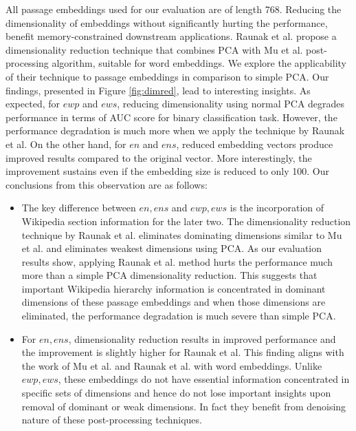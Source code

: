 \documentclass[sigconf,authordraft]{acmart}
\begin{document}
All passage embeddings used for our evaluation are of length 768. Reducing the dimensionality of embeddings without significantly hurting the performance, benefit memory-constrained downstream applications. Raunak et al. propose a dimensionality reduction technique that combines PCA with Mu et al. post-processing algorithm, suitable for word embeddings. We explore the applicability of their technique to passage embeddings in comparison to simple PCA. Our findings, presented in Figure \ref{fig:dimred}, lead to interesting insights. As expected, for $ewp$ and $ews$, reducing dimensionality using normal PCA degrades performance in terms of AUC score for binary classification task. However, the performance degradation is much more when we apply the technique by Raunak et al. On the other hand, for $en$ and $ens$, reduced embedding vectors produce improved results compared to the original vector. More interestingly, the improvement sustains even if the embedding size is reduced to only 100. Our conclusions from this observation are as follows:
\begin{itemize}
    \item The key difference between $en, ens$ and $ewp, ews$ is the incorporation of Wikipedia section information for the later two. The dimensionality reduction technique by Raunak et al. eliminates dominating dimensions similar to Mu et al. and eliminates weakest dimensions using PCA. As our evaluation results show, applying Raunak et al. method hurts the performance much more than a simple PCA dimensionality reduction. This suggests that important Wikipedia hierarchy information is concentrated in dominant dimensions of these passage embeddings and when those dimensions are eliminated, the performance degradation is much severe than simple PCA.
    \item For $en, ens$, dimensionality reduction results in improved performance and the improvement is slightly higher for Raunak et al. This finding aligns with the work of Mu et al. and Raunak et al. with word embeddings. Unlike $ewp, ews$, these embeddings do not have essential information concentrated in specific sets of dimensions and hence do not lose important insights upon removal of dominant or weak dimensions. In fact they benefit from denoising nature of these post-processing techniques.
\end{itemize}
\end{document}
